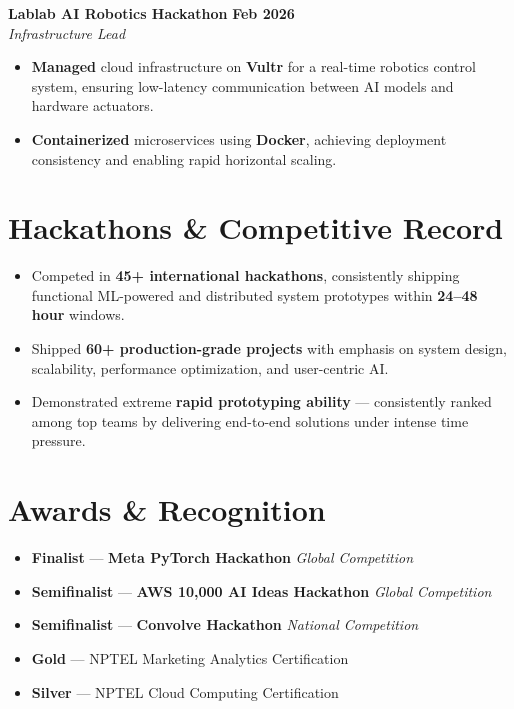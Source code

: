 \documentclass[a4paper,10pt]{article}
\begin{document}
\vspace{4pt}

\textbf{Lablab AI Robotics Hackathon} \hfill \textbf{Feb 2026} \\
\textit{Infrastructure Lead}
\begin{itemize}
    \item \textbf{Managed} cloud infrastructure on \textbf{Vultr} for a real-time robotics control system, ensuring low-latency communication between AI models and hardware actuators.
    \item \textbf{Containerized} microservices using \textbf{Docker}, achieving deployment consistency and enabling rapid horizontal scaling.
\end{itemize}

\section{Hackathons \& Competitive Record}
\begin{itemize}
    \item Competed in \textbf{45+ international hackathons}, consistently shipping functional ML-powered and distributed system prototypes within \textbf{24--48 hour} windows.
    \item Shipped \textbf{60+ production-grade projects} with emphasis on system design, scalability, performance optimization, and user-centric AI.
    \item Demonstrated extreme \textbf{rapid prototyping ability} --- consistently ranked among top teams by delivering end-to-end solutions under intense time pressure.
\end{itemize}

\section{Awards \& Recognition}
\begin{itemize}
    \item \textbf{Finalist} --- \textbf{Meta PyTorch Hackathon} \hfill \textit{Global Competition}
    \item \textbf{Semifinalist} --- \textbf{AWS 10,000 AI Ideas Hackathon} \hfill \textit{Global Competition}
    \item \textbf{Semifinalist} --- \textbf{Convolve Hackathon} \hfill \textit{National Competition}
    \item \textbf{Gold } --- NPTEL Marketing Analytics Certification
    \item \textbf{Silver } --- NPTEL Cloud Computing Certification
\end{itemize}
\end{document}
